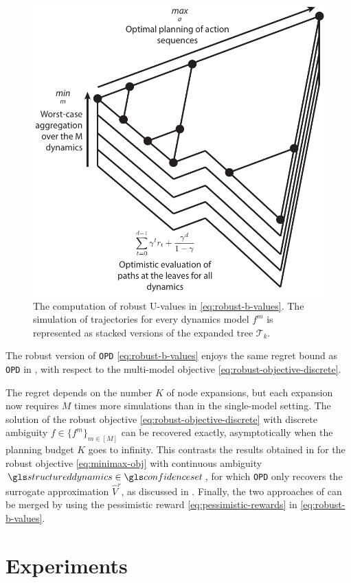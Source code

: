 \begin{figure}
	\centering
	\includegraphics[width=0.45\linewidth]{img/robust-control-tree}
	\caption{The computation of robust U-values in \eqref{eq:robust-b-values}. The simulation of trajectories for every dynamics model $f^m$ is represented as stacked versions of the expanded tree $\mathcal{T}_k$.}
	\label{fig:drop}
\end{figure}

\begin{theorem}
	\label{theorem:drop-regret}
	\begin{leftbar}[theorembar]
	The robust version of \texttt{OPD} \eqref{eq:robust-b-values} enjoys the same regret bound as \texttt{OPD} in , with respect to the multi-model objective \eqref{eq:robust-objective-discrete}.
	\end{leftbar}
\end{theorem}

The regret depends on the number $K$ of node expansions, but each expansion now requires $M$ times more simulations than in the single-model setting. The solution of the robust objective \eqref{eq:robust-objective-discrete} with discrete ambiguity $f\in\{f^m\}_{m\in[M]}$ can be recovered exactly, asymptotically when the planning budget $K$ goes to infinity. This contrasts the results obtained in  for the robust objective \eqref{eq:minimax-obj} with continuous ambiguity $\structureddynamics\in\confidenceset$, for which \texttt{OPD} only recovers the surrogate approximation $\hat{V}^r$, as discussed in . Finally, the two approaches of  can be merged by using the pessimistic reward \eqref{eq:pessimistic-rewards} in \eqref{eq:robust-b-values}.

\section{Experiments}
\label{sec:interval-experiments}

